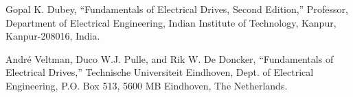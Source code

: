 \documentclass[conference]{IEEEtran}
\begin{document}
\begin{thebibliography}{00}
Gopal K. Dubey,
``Fundamentals of Electrical Drives, Second Edition,''
Professor, Department of Electrical Engineering, Indian Institute of Technology, Kanpur, Kanpur-208016, India.

André Veltman, Duco W.J. Pulle, and Rik W. De Doncker,
``Fundamentals of Electrical Drives,''
Technische Universiteit Eindhoven, Dept. of Electrical Engineering, P.O. Box 513, 5600 MB Eindhoven, The Netherlands.

\end{thebibliography}
\vspace{12pt}
\end{document}
